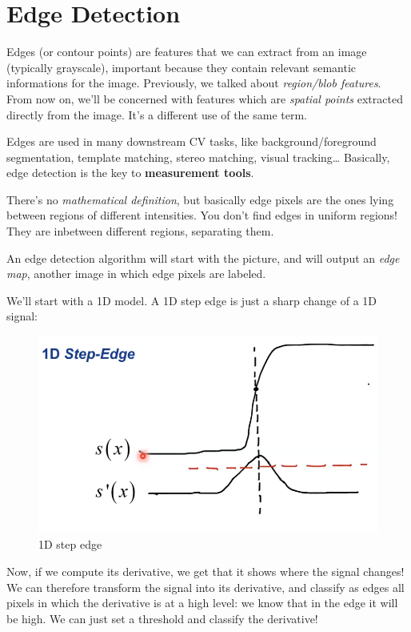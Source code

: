 \documentclass{article}
\begin{document}
\section{Edge Detection}\label{edge-detection}

Edges (or contour points) are features that we can extract from an image
(typically grayscale), important because they contain relevant semantic
informations for the image. Previously, we talked about
\emph{region/blob features}. From now on, we'll be concerned with
features which are \emph{spatial points} extracted directly from the
image. It's a different use of the same term.

Edges are used in many downstream CV tasks, like background/foreground
segmentation, template matching, stereo matching, visual
tracking\ldots{} Basically, edge detection is the key to
\textbf{measurement tools}.

There's no \emph{mathematical definition}, but basically edge pixels are
the ones lying between regions of different intensities. You don't find
edges in uniform regions! They are inbetween different regions,
separating them.

An edge detection algorithm will start with the picture, and will output
an \emph{edge map}, another image in which edge pixels are labeled.

We'll start with a 1D model. A 1D step edge is just a sharp change of a
1D signal:

\begin{figure}
\centering
\includegraphics{./res/stepedge-1d.png}
\caption{1D step edge}
\end{figure}

Now, if we compute its derivative, we get that it shows where the signal
changes! We can therefore transform the signal into its derivative, and
classify as edges all pixels in which the derivative is at a high level:
we know that in the edge it will be high. We can just set a threshold
and classify the derivative!
\end{document}
